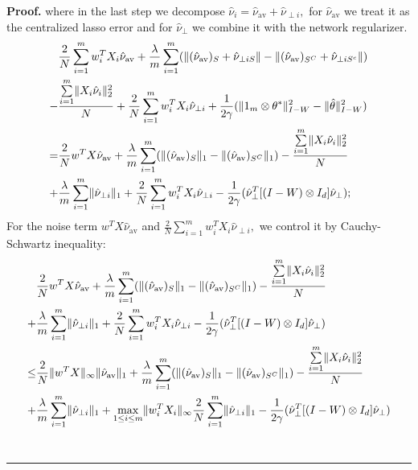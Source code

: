\documentclass{article}
\theoremstyle{break}
\newenvironment{proof}[1][Proof]{\noindent\textbf{#1.} }{\ \rule{0.5em}{0.5em}}
\newcommand{\T}{\theta}
\begin{document}
\begin{proof}
    where in the last step we decompose $\hat{\nu}_i=\hat{\nu}_{
    \text{av}}+\hat{\nu}_{\perp i},$ for $\hat{\nu}_{\text{av}}$ we treat it as the centralized lasso error and for $\hat{\nu}_{\perp}$ we combine it with the network regularizer.
    \begin{align}
    &\frac{2}{N}\sum\limits_{i=1}^m w_i^TX_i\hat{\nu}_{\text{av}}+\frac{\lambda}{m}\sum\limits_{i=1}^m(\lVert(\hat{\nu}_{\text{av}})_{S}+\hat{\nu}_{\perp i S}\rVert-\lVert(\hat{\nu}_{\text{av}})_{S^C}+\hat{\nu}_{\perp i S^c}\rVert)\notag\\
    -&\frac{\sum\limits_{i=1}^m\lVert X_i\hat{\nu}_i\rVert_2^2}{N}
    +\frac{2}{N}\sum\limits_{i=1}^m w_i^TX_i\hat{\nu}_{\perp i}+\frac{1}{2\gamma}(\lVert1_{m}\otimes\T^*\rVert_{I-W}^2-\lVert\hat{\T}\rVert_{I-W}^2)\notag\\
    =&\frac{2}{N}w^TX\hat{\nu}_{\text{av}}+\frac{\lambda}{m}\sum\limits_{i=1}^m(\lVert(\hat{\nu}_{\text{av}})_{S}\rVert_1-\lVert(\hat{\nu}_{\text{av}})_{S^C}\rVert_1)-\frac{\sum\limits_{i=1}^m\lVert X_i
    \hat{\nu}_i\rVert_2^2}{N}\notag\\
    +&\frac{\lambda}{m}\sum\limits_{i=1}^m\lVert\hat{\nu}_{\perp i}\rVert_1+\frac{2}{N}\sum\limits_{i=1}^m w_i^TX_i\hat{\nu}_{\perp i}-\frac{1}{2\gamma}(\hat{\nu}_{\perp}^T[(I-W)\otimes I_d]\hat{\nu}_{\perp})\notag;\\
    \end{align}
    For the noise term $w^TX\hat{\nu}_{\text{av}}$ and $\frac{2}{N}\sum\limits_{i=1}^m w_i^TX_i\hat{\nu}_{\perp i},$ we control it by Cauchy-Schwartz inequality:
    \begin{align}
    &\frac{2}{N}w^TX\hat{\nu}_{\text{av}}+\frac{\lambda}{m}\sum\limits_{i=1}^m(\lVert(\hat{\nu}_{\text{av}})_{S}\rVert_1-\lVert(\hat{\nu}_{\text{av}})_{S^C}\rVert_1)-\frac{\sum\limits_{i=1}^m\lVert X_i
    \hat{\nu}_i\rVert_2^2}{N}\notag\\
    +&\frac{\lambda}{m}\sum\limits_{i=1}^m\lVert\hat{\nu}_{\perp i}\rVert_1+\frac{2}{N}\sum\limits_{i=1}^m w_i^TX_i\hat{\nu}_{\perp i}-\frac{1}{2\gamma}(\hat{\nu}_{\perp}^T[(I-W)\otimes I_d]\hat{\nu}_{\perp})\notag\\
    \leq & \frac{2}{N}\lVert w^TX\rVert_{\infty}\lVert\hat{\nu}_{\text{av}}\rVert_1+\frac{\lambda}{m}\sum\limits_{i=1}^m(\lVert(\hat{\nu}_{\text{av}})_{S}\rVert_1-\lVert(\hat{\nu}_{\text{av}})_{S^C}\rVert_1)-\frac{\sum\limits_{i=1}^m\lVert X_i
    \hat{\nu}_i\rVert_2^2}{N}\notag\\
    +&\frac{\lambda}{m}\sum\limits_{i=1}^m\lVert\hat{\nu}_{\perp i}\rVert_1+\max\limits_{1\leq i\leq m}\lVert w_i^T X_i\rVert_{\infty}\frac{2}{N}\sum\limits_{i=1}^m\lVert\hat{\nu}_{\perp i}\rVert_1-\frac{1}{2\gamma}(\hat{\nu}_{\perp}^T[(I-W)\otimes I_d]\hat{\nu}_{\perp})\notag\\

\end{align}
\end{proof}
\end{document}
